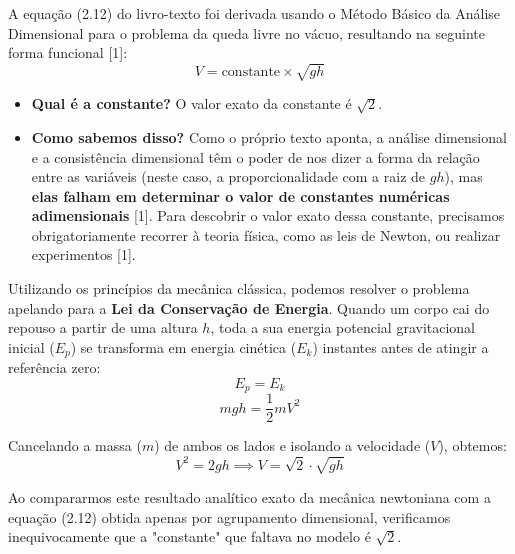 A equação (2.12) do livro-texto foi derivada usando o Método Básico da Análise Dimensional para o problema da queda livre no vácuo, resultando na seguinte forma funcional [1]:
$$ V = \text{constante} \times \sqrt{gh} $$

\begin{itemize}
    \item \textbf{Qual é a constante?} O valor exato da constante é $\sqrt{2}$.
    \item \textbf{Como sabemos disso?} Como o próprio texto aponta, a análise dimensional e a consistência dimensional têm o poder de nos dizer a forma da relação entre as variáveis (neste caso, a proporcionalidade com a raiz de $gh$), mas \textbf{elas falham em determinar o valor de constantes numéricas adimensionais} [1]. Para descobrir o valor exato dessa constante, precisamos obrigatoriamente recorrer à teoria física, como as leis de Newton, ou realizar experimentos [1].
\end{itemize}

Utilizando os princípios da mecânica clássica, podemos resolver o problema apelando para a \textbf{Lei da Conservação de Energia}. Quando um corpo cai do repouso a partir de uma altura $h$, toda a sua energia potencial gravitacional inicial ($E_p$) se transforma em energia cinética ($E_k$) instantes antes de atingir a referência zero:
$$ E_p = E_k $$
$$ mgh = \frac{1}{2}mV^2 $$

Cancelando a massa ($m$) de ambos os lados e isolando a velocidade ($V$), obtemos:
$$ V^2 = 2gh \implies V = \sqrt{2} \cdot \sqrt{gh} $$

Ao compararmos este resultado analítico exato da mecânica newtoniana com a equação (2.12) obtida apenas por agrupamento dimensional, verificamos inequivocamente que a "constante" que faltava no modelo é $\sqrt{2}$.
